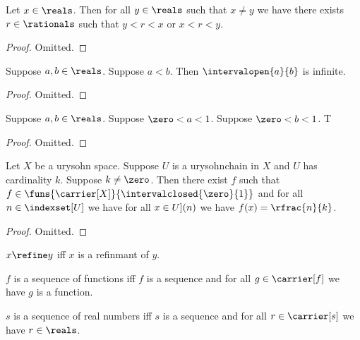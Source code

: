 \begin{lemma}\label{fraction1}
    Let $x \in \reals$.
    Then for all $y \in \reals$ such that $x \neq y$ we have there exists $r \in \rationals$ such that $y < r < x$ or $x < r < y$.
\end{lemma}
\begin{proof}
    Omitted.
\end{proof}

\begin{lemma}\label{frection2}
    Suppose $a,b \in \reals$.
    Suppose $a < b$.
    Then $\intervalopen{a}{b}$ is infinite.
\end{lemma}
\begin{proof}
    Omitted.
\end{proof}

\begin{lemma}\label{frection3}
    Suppose $a,b \in \reals$.
    Suppose $\zero < a < 1$.
    Suppose $\zero < b < 1$.
    T
\end{lemma}
\begin{proof}
    Omitted.
\end{proof}


\begin{proposition}\label{existence_of_staircase_function}
    Let $X$ be a urysohn space.
    Suppose $U$ is a urysohnchain in $X$ and $U$ has cardinality $k$.
    Suppose $k \neq \zero$.
    Then there exist $f$ such that $f \in \funs{\carrier[X]}{\intervalclosed{\zero}{1}}$ 
    and for all $n \in \indexset[U]$ we have for all $x \in \index[U](n)$ 
    we have $f(x) = \rfrac{n}{k}$.
\end{proposition}
\begin{proof}
    Omitted.
\end{proof}

\begin{abbreviation}\label{refinment_abbreviation}
    $x \refine y$ iff $x$ is a refinmant of $y$.
\end{abbreviation}





\begin{abbreviation}\label{sequence_of_functions}
    $f$ is a sequence of functions iff $f$ is a sequence 
    and for all $g \in \carrier[f]$ we have $g$ is a function.
\end{abbreviation}

\begin{abbreviation}\label{sequence_in_reals}
    $s$ is a sequence of real numbers iff $s$ is a sequence 
    and for all $r \in \carrier[s]$ we have $r \in \reals$.
\end{abbreviation}



